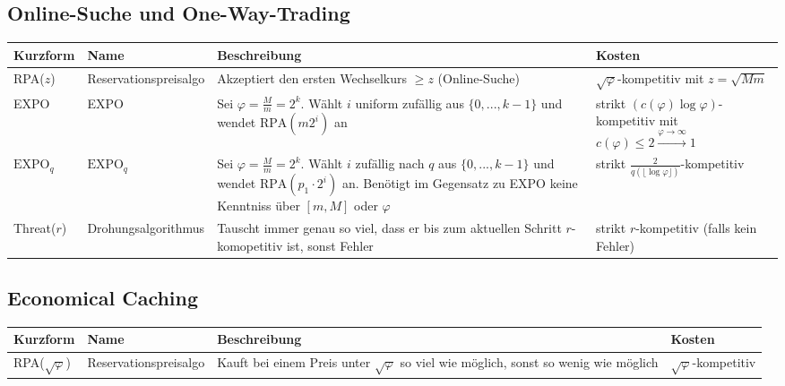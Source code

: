 \subsection{Online-Suche und One-Way-Trading}
\begin{tabularx}{\textwidth}{|l|l|X|X|} \hline
Kurzform & Name & Beschreibung & Kosten\\ \hline \hline
RPA($z$) & Reservationspreisalgo & Akzeptiert den ersten Wechselkurs $\geq z$ (Online-Suche) & $\sqrt{\varphi}$-kompetitiv mit $z=\sqrt{Mm}$ \\ \hline
EXPO & EXPO & Sei $\varphi = \frac{M}{m} = 2^k$. Wählt $i$ uniform zufällig aus $\{0,...,k-1\}$ und wendet $\textrm{RPA}(m2^i)$ an & strikt $(c(\varphi)\log\varphi)$-kompetitiv mit $c(\varphi) \leq 2 \xrightarrow{\varphi \rightarrow \infty} 1$ \\ \hline
$\textrm{EXPO}_q$ & $\textrm{EXPO}_q$ & Sei $\varphi = \frac{M}{m} = 2^k$. Wählt $i$ zufällig nach $q$ aus $\{0,...,k-1\}$ und wendet $\textrm{RPA}(p_1\cdot2^i)$ an. Benötigt im Gegensatz zu EXPO keine Kenntniss über $[m,M]$ oder $\varphi$ & strikt $\frac{2}{q(\lfloor\log\varphi\rfloor)}$-kompetitiv \\ \hline
Threat($r$) & Drohungsalgorithmus & Tauscht immer genau so viel, dass er bis zum aktuellen Schritt $r$-komopetitiv ist, sonst Fehler & strikt $r$-kompetitiv (falls kein Fehler) \\ \hline
\end{tabularx}

\subsection{Economical Caching}
\begin{tabularx}{\textwidth}{|l|l|X|X|} \hline
Kurzform & Name & Beschreibung & Kosten\\ \hline \hline
RPA($\sqrt{\varphi}$) & Reservationspreisalgo & Kauft bei einem Preis unter $\sqrt{\varphi}$ so viel wie möglich, sonst so wenig wie möglich & $\sqrt{\varphi}$-kompetitiv \\ \hline
\end{tabularx}


